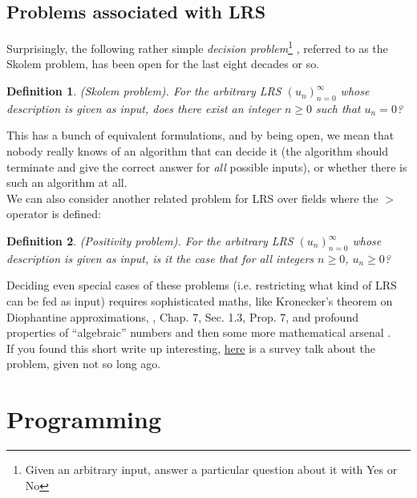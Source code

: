 \documentclass[a4paper,11pt]{article}
\newtheorem{definition}{Definition}
\numberwithin{definition}{section}
\numberwithin{mytheorem}{subsection}
\begin{document}
\subsection{Problems associated with LRS}

Surprisingly, the following rather simple \emph{decision problem}\footnote{Given an arbitrary input, answer a particular question about it with Yes or No} , referred to as the Skolem problem,
has been open for the last eight decades or so.

\begin{definition}
\emph{(Skolem problem)}. For the arbitrary LRS $(u_n)^\infty_{n=0}$ whose description is given as
input, does there exist an integer $n \geq 0$ such that $u_n = 0$?
\end{definition}
This has a bunch of equivalent formulations, and by being open, we mean that nobody really knows of an algorithm that can decide it (the algorithm should terminate and give the correct
answer for \emph{all} possible inputs), or whether there is such an algorithm at all.\\
We can also consider another related problem for LRS over fields where the $>$ operator is defined:

\begin{definition}
\emph{(Positivity problem)}. For the arbitrary LRS $(u_n)^\infty_{n=0}$ whose description is given as
input, is it the case that for all integers $n \geq 0$, $u_n \geq 0$?
\end{definition}
Deciding even special cases of these problems (i.e. restricting what kind of LRS can be fed as
input) requires sophisticated maths, like Kronecker’s theorem on Diophantine approximations, \cite{Bourbaki}, Chap. 7, Sec. 1.3, Prop. 7, and profound properties of “algebraic” numbers \cite{Mignotte} and then some
more mathematical arsenal \cite{JPBell, Renegar}.\\
If you found this short write up interesting, \href{https://fmindia.cmi.ac.in/update2013/presentations/S-Akshay.pdf}{here} is a survey talk about the problem, given not so
long ago.
\newpage



\section{Programming}
\end{document}
